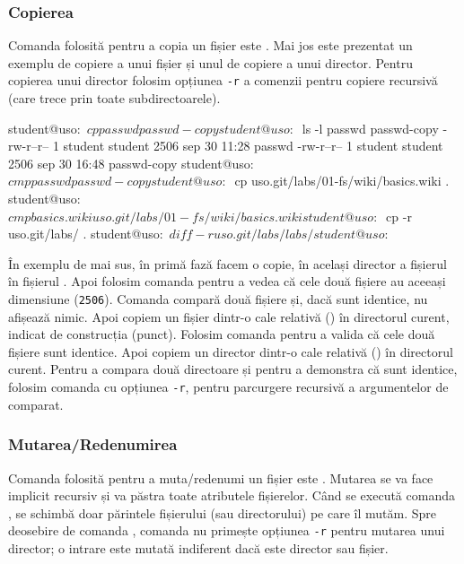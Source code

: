 \subsubsection{Copierea}
\label{sec:file-system-file-cp}

Comanda folosită pentru a copia un fișier este . Mai jos este prezentat un exemplu de copiere a unui fișier și unul de copiere a unui director. Pentru copierea unui director folosim opțiunea \texttt{-r} a comenzii  pentru copiere recursivă (care trece prin toate subdirectoarele).

\begin{screen}
student@uso:~$ cp passwd passwd-copy
student@uso:~$ ls -l passwd passwd-copy
-rw-r--r-- 1 student student 2506 sep 30 11:28 passwd
-rw-r--r-- 1 student student 2506 sep 30 16:48 passwd-copy
student@uso:~$ cmp passwd passwd-copy
student@uso:~$ cp uso.git/labs/01-fs/wiki/basics.wiki .
student@uso:~$ cmp basics.wiki uso.git/labs/01-fs/wiki/basics.wiki
student@uso:~$ cp -r uso.git/labs/ .
student@uso:~$ diff -r uso.git/labs/ labs/
student@uso:~$
\end{screen}

În exemplu de mai sus, în primă fază facem o copie, în același director a fișierul  în fișierul . Apoi folosim comanda  pentru a vedea că cele două fișiere au aceeași dimensiune (\texttt{2506}). Comanda  compară două fișiere și, dacă sunt identice, nu afișează nimic. Apoi copiem un fișier dintr-o cale relativă () în directorul curent, indicat de construcția  (punct). Folosim comanda  pentru a valida că cele două fișiere sunt identice. Apoi copiem un director dintr-o cale relativă () în directorul curent. Pentru a compara două directoare și pentru a demonstra că sunt identice, folosim comanda  cu opțiunea \texttt{-r}, pentru parcurgere recursivă a argumentelor de comparat.

\subsubsection{Mutarea/Redenumirea}
\label{sec:file-system-file-mv}

Comanda folosită pentru a muta/redenumi un fișier este . Mutarea se va face implicit recursiv și va păstra toate
atributele fișierelor. Când se execută comanda , se schimbă doar
părintele fișierului (sau directorului) pe care îl mutăm. Spre deosebire de comanda , comanda  nu primește opțiunea \texttt{-r} pentru mutarea unui director; o intrare este mutată indiferent dacă este director sau fișier.

